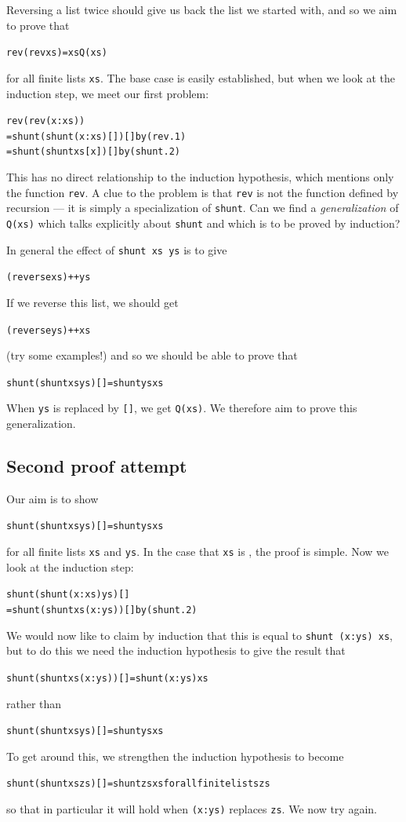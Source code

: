 Reversing a list twice should give us back the list we started with, and so
we aim to prove that 
\begin{alltt}
rev (rev xs) = xs \hfill Q(xs)
\end{alltt}
for
all finite lists \texttt{xs}. The base case is easily established, but when we
look at the induction step, we meet our first problem:
\begin{alltt}
rev (rev (x:xs))
  = shunt (shunt (x:xs) []) [] \hfill {\rm by} (rev.1)
  = shunt (shunt xs [x]) []\hfill {\rm by} (shunt.2)
\end{alltt} 
This has no direct relationship to the induction
hypothesis, which mentions only the function \texttt{rev}. A clue to the problem
is that \texttt{rev} is not the function defined by recursion --- it is simply a
specialization of \texttt{shunt}. Can we find a {\em generalization\/} of 
\texttt{Q(xs)} which talks explicitly about \texttt{shunt} and which is to be proved by
induction? 

In general the effect of \texttt{shunt xs ys} is to give
\begin{alltt}
(reverse xs) ++ ys
\end{alltt}
If we reverse this list, we should get
\begin{alltt}
(reverse ys) ++ xs
\end{alltt}
(try some examples!) and so we should be able to prove that
\begin{alltt}
shunt (shunt xs ys) [] = shunt ys xs
\end{alltt}
When \texttt{ys} is replaced by 
\texttt{[]}, we get \texttt{Q(xs)}. We therefore aim to prove this generalization.

\subsection*{Second proof attempt}

Our aim is to show
\begin{alltt}
shunt (shunt xs ys) [] = shunt ys xs
\end{alltt}
for all finite lists \texttt{xs} and \texttt{ys}. In the case that \texttt{xs} is {\mi
[]}, the proof is simple. Now we look at the induction step:
\begin{alltt}
shunt (shunt (x:xs) ys) [] 
  = shunt (shunt xs (x:ys)) [] \hfill {\rm by} (shunt.2)
\end{alltt}
We would now like to claim by induction that this is equal to \texttt{shunt
(x:ys) xs}, but to do this we need the induction hypothesis to give the result
that
\begin{alltt}
shunt (shunt xs (x:ys)) [] = shunt (x:ys) xs
\end{alltt}
rather than 
\begin{alltt}
shunt (shunt xs ys) [] = shunt ys xs\end{alltt}
To get around this, we strengthen the induction hypothesis to become
\begin{alltt}
shunt (shunt xs zs) [] = shunt zs xs {\rm for all finite lists} zs\end{alltt}
so that in particular it will hold when \texttt{(x:ys)} replaces \texttt{zs}. We now
try again.


